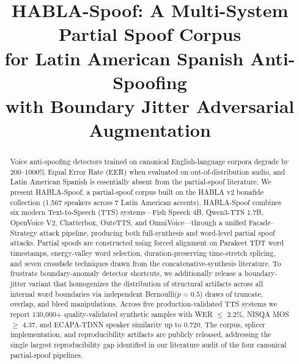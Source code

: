 \documentclass[conference]{IEEEtran}
\begin{document}
\title{HABLA-Spoof: A Multi-System Partial Spoof Corpus\\
for Latin American Spanish Anti-Spoofing\\
with Boundary Jitter Adversarial Augmentation}

\author{
\and
{}
}

\maketitle

\begin{abstract}
Voice anti-spoofing detectors trained on canonical English-language corpora degrade by 200--1000\% Equal Error Rate (EER) when evaluated on out-of-distribution audio, and Latin American Spanish is essentially absent from the partial-spoof literature. We present HABLA-Spoof, a partial-spoof corpus built on the HABLA v2 bonafide collection (1,567 speakers across 7 Latin American accents). HABLA-Spoof combines six modern Text-to-Speech (TTS) systems---Fish Speech 4B, Qwen3-TTS 1.7B, OpenVoice V2, Chatterbox, OuteTTS, and OmniVoice---through a unified Facade--Strategy attack pipeline, producing both full-synthesis and word-level partial spoof attacks. Partial spoofs are constructed using forced alignment on Parakeet TDT word timestamps, energy-valley word selection, duration-preserving time-stretch splicing, and seven crossfade techniques drawn from the concatenative-synthesis literature. To frustrate boundary-anomaly detector shortcuts, we additionally release a boundary-jitter variant that homogenizes the distribution of structural artifacts across all internal word boundaries via independent Bernoulli($p{=}0.5$) draws of truncate, overlap, and bleed manipulations. Across five production-validated TTS systems we report 130{,}000+ quality-validated synthetic samples with WER $\leq$ 2.2\%, NISQA MOS $\geq$ 4.37, and ECAPA-TDNN speaker similarity up to 0.720. The corpus, splicer implementation, and reproducibility artifacts are publicly released, addressing the single largest reproducibility gap identified in our literature audit of the four canonical partial-spoof pipelines.
\end{abstract}
\end{document}
